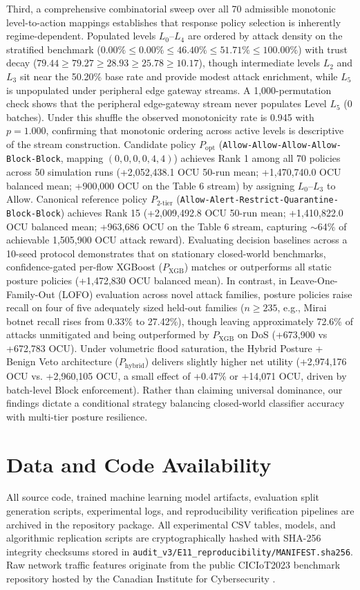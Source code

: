 \documentclass[journal,10pt,onecolumn]{IEEEtran}
\begin{document}
Third, a comprehensive combinatorial sweep over all 70 admissible monotonic level-to-action mappings establishes that response policy selection is inherently regime-dependent. Populated levels $L_0$--$L_4$ are ordered by attack density on the stratified benchmark ($0.00\% \le 0.00\% \le 46.40\% \le 51.71\% \le 100.00\%$) with trust decay ($79.44 \ge 79.27 \ge 28.93 \ge 25.78 \ge 10.17$), though intermediate levels $L_2$ and $L_3$ sit near the 50.20\% base rate and provide modest attack enrichment, while $L_5$ is unpopulated under peripheral edge gateway streams. A 1,000-permutation check shows that the peripheral edge-gateway stream never populates Level $L_5$ (0 batches). Under this shuffle the observed monotonicity rate is 0.945 with $p = 1.000$, confirming that monotonic ordering across active levels is descriptive of the stream construction. Candidate policy $P_{\text{opt}}$ (\texttt{Allow-Allow-Allow-Allow-Block-Block}, mapping $(0,0,0,0,4,4)$) achieves Rank 1 among all 70 policies across 50 simulation runs (+2,052,438.1 OCU 50-run mean; +1,470,740.0 OCU balanced mean; +900,000 OCU on the Table 6 stream) by assigning $L_0$--$L_3$ to Allow. Canonical reference policy $P_{2\text{-tier}}$ (\texttt{Allow-Alert-Restrict-Quarantine-Block-Block}) achieves Rank 15 (+2,009,492.8 OCU 50-run mean; +1,410,822.0 OCU balanced mean; +963,686 OCU on the Table 6 stream, capturing $\sim$64\% of achievable 1,505,900 OCU attack reward). Evaluating decision baselines across a 10-seed protocol demonstrates that on stationary closed-world benchmarks, confidence-gated per-flow XGBoost ($P_{\text{XGB}}$) matches or outperforms all static posture policies (+1,472,830 OCU balanced mean). In contrast, in Leave-One-Family-Out (LOFO) evaluation across novel attack families, posture policies raise recall on four of five adequately sized held-out families ($n \ge 235$, e.g., Mirai botnet recall rises from 0.33\% to 27.42\%), though leaving approximately 72.6\% of attacks unmitigated and being outperformed by $P_{\text{XGB}}$ on DoS (+673,900 vs +672,783 OCU). Under volumetric flood saturation, the Hybrid Posture + Benign Veto architecture ($P_{\text{hybrid}}$) delivers slightly higher net utility (+2,974,176 OCU vs. +2,960,105 OCU, a small effect of +0.47\% or +14,071 OCU, driven by batch-level Block enforcement). Rather than claiming universal dominance, our findings dictate a conditional strategy balancing closed-world classifier accuracy with multi-tier posture resilience.

\section*{Data and Code Availability}
All source code, trained machine learning model artifacts, evaluation split generation scripts, experimental logs, and reproducibility verification pipelines are archived in the repository package. All experimental CSV tables, models, and algorithmic replication scripts are cryptographically hashed with SHA-256 integrity checksums stored in \texttt{audit\_v3/E11\_reproducibility/MANIFEST.sha256}. Raw network traffic features originate from the public CICIoT2023 benchmark repository hosted by the Canadian Institute for Cybersecurity \cite{3}.
\end{document}
